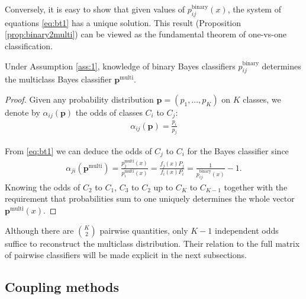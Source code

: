 Conversely, it is easy to show that  given values of $p_{ij}^\textrm{binary}(x)$, the system of equations \eqref{eq:bt1} has a unique solution. This result (Proposition \ref{prop:binary2multi}) can be viewed as the fundamental theorem of one-vs-one classification.

\begin{prop}
	 \label{prop:binary2multi}
	 Under Assumption \ref{ass:1}, knowledge of binary Bayes classifiers $p^\textrm{binary}_{ij}$ determines the multiclass Bayes classifier 
	 $\boldsymbol{p}^\textrm{multi}$.
\end{prop}
\begin{proof}
	Given any probability distribution $\boldsymbol{p} = (p_1, \ldots,p_K)$ on $K$ classes, we denote by $\alpha_{ij}(\boldsymbol{p})$ the odds of classes $C_i$ to $C_j$:
	\begin{align}
		\alpha_{ij}(\boldsymbol{p}) = \frac{p_i}{p_j} \label{eq:alpha}
	\end{align}
	
	From \eqref{eq:bt1} we can deduce the odds of  $C_j$ to $C_i$ for the Bayes classifier since
	\begin{align}
	\alpha_{ji}(\boldsymbol{p}^\textrm{multi}) = \frac{p_j^\textrm{multi}(x)}{p_i^\textrm{multi}(x)}
	=  \frac{f_j(x) P_j}{f_i(x) P_i} = \frac{1}{p^\textrm{binary}_{ij}(x)}- 1.
	\end{align}
	Knowing the odds of $C_2$ to $C_1$, $C_3$ to $C_2$ up to $C_{K}$ to $C_{K-1}$ together with the requirement that probabilities sum to one uniquely determines the whole vector $\boldsymbol{p}^\textrm{multi}(x)$.
\end{proof}

Although there are $\binom{K}{2}$ pairwise quantities, only $K-1$ independent odds suffice to reconstruct the multiclass distribution. Their relation to the full matrix of pairwise classifiers will be made explicit in the next subsections.


\subsection{Coupling methods}

